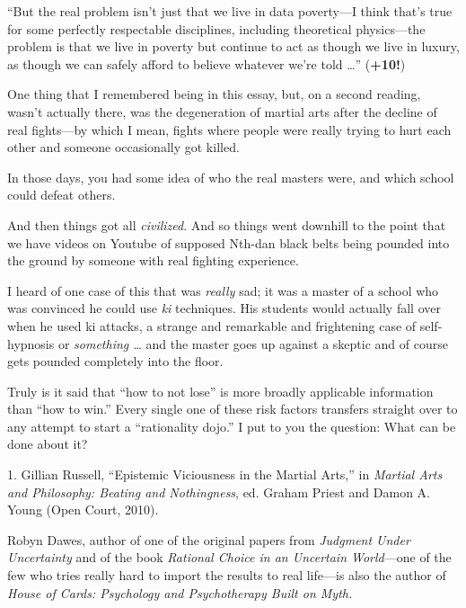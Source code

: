 {
 ``But the real problem isn't just
that we live in data poverty---I think that's true for
some perfectly respectable disciplines, including theoretical
physics---the problem is that we live in poverty but continue to act as
though we live in luxury, as though we can safely afford to believe
whatever we're told \ldots''
(\textbf{+10!})}

{
 One thing that I remembered being in this essay, but, on a second
reading, wasn't actually there, was the degeneration of
martial arts after the decline of real fights---by which I mean, fights
where people were really trying to hurt each other and someone
occasionally got killed.}

{
 In those days, you had some idea of who the real masters were, and
which school could defeat others.}

{
 And then things got all \textit{civilized}. And so things went
downhill to the point that we have videos on Youtube of supposed
Nth-dan black belts being pounded into the ground by someone with real
fighting experience.}

{
 I heard of one case of this that was \textit{really} sad; it was a
master of a school who was convinced he could use \textit{ki}
techniques. His students would actually fall over when he used ki
attacks, a strange and remarkable and frightening case of self-hypnosis
or \textit{something \ldots} and the master goes up against a skeptic
and of course gets pounded completely into the floor.}

{
 Truly is it said that ``how to not
lose'' is more broadly applicable information than
``how to win.'' Every single one of
these risk factors transfers straight over to any attempt to start a
``rationality dojo.'' I put to you
the question: What can be done about it?}

\myendsectiontext


\bigskip

{
 1. Gillian Russell, ``Epistemic Viciousness in
the Martial Arts,'' in \textit{Martial Arts and
Philosophy: Beating and Nothingness}, ed. Graham Priest and Damon A.
Young (Open Court, 2010).}


{
 Robyn Dawes, author of one of the original papers from
\textit{Judgment Under Uncertainty} and of the book \textit{Rational
Choice in an Uncertain World}{}---one of the few who tries really hard
to import the results to real life---is also the author of
\textit{House of Cards: Psychology and Psychotherapy Built on Myth.} }

